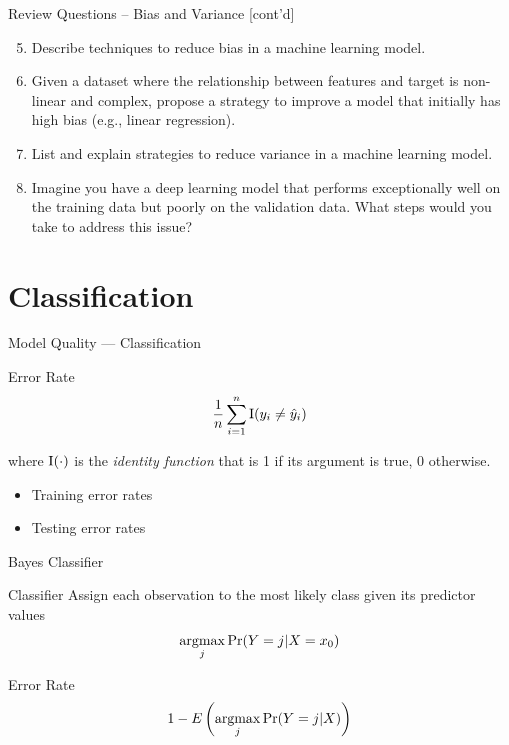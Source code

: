 \documentclass[ignorenonframetext,xcolor=x11names]{beamer}
\begin{document}
\begin{frame}{Review Questions -- Bias and Variance \small [cont'd]}
\begin{enumerate}
  \setcounter{enumi}{4}
  \item Describe techniques to reduce bias in a machine learning model.
  \item Given a dataset where the relationship between features and target is non-linear and complex, propose a strategy to improve a model that initially has high bias (e.g., linear regression).
  \item List and explain strategies to reduce variance in a machine learning model.
  \item Imagine you have a deep learning model that performs exceptionally well on the training data but poorly on the validation data. What steps would you take to address this issue?
\end{enumerate}
\end{frame}

\section{Classification}

\begin{frame}{Model Quality --- Classification}
\begin{block}{Error Rate}
\begin{align*}
\frac{1}{n}\sum^n_{i=1} \operatorname{I}(y_i \neq \hat{y}_i)
\end{align*}
\end{block}
\footnotesize
where $\operatorname{I}(\cdot)$ is the \emph{identity function} that is 1 if its argument is true, 0 otherwise.
\normalsize

\vspace{\baselineskip}
\begin{itemize}
  \item Training error rates
  \item Testing error rates
\end{itemize}
\end{frame}

\begin{frame}{Bayes Classifier}
\small
\begin{block}{Classifier}
Assign each observation to the most likely class given its predictor values
\begin{align*}
\operatorname*{argmax}_j \Pr(Y=j| X=x_0)
\end{align*}
\end{block}

\begin{block}{Error Rate}
\begin{align*}
1 - E \left( \operatorname*{argmax}_j \Pr (Y=j | X) \right)
\end{align*}
\end{block}
\end{frame}
\end{document}
